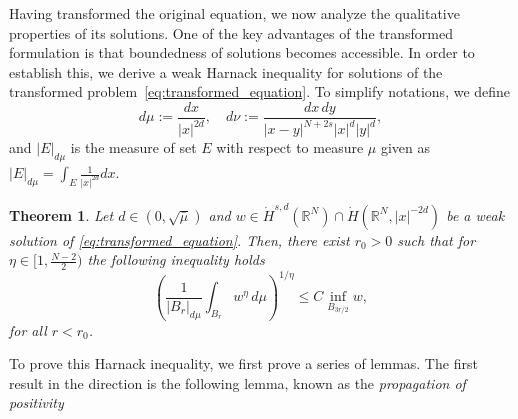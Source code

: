 \documentclass[11pt]{article}
\newtheorem{theorem}{Theorem}[section] %
\newcommand{\rnn}{\mathbb{R}^{N}}
\begin{document}
Having transformed the original equation, we now analyze the qualitative properties of its solutions. One of the key advantages of the transformed formulation is that boundedness of solutions becomes accessible. In order to establish this, we derive a weak Harnack inequality for solutions of the transformed problem~\eqref{eq:transformed_equation}. To simplify notations, we define
\begin{equation*}
    d\mu := \frac{dx}{|x|^{2d}}, \quad 
    d\nu := \frac{dx\,dy}{|x - y|^{N + 2s} |x|^{d} |y|^{d}},
\end{equation*}
and $|E|_{d\mu}$ is the measure of set $E$ with respect to measure $\mu$ given as $|E|_{d\mu} = \int_{E} \frac{1}{|x|^{2 d}} dx$.
\begin{theorem}\label{thm:harnack_inequality_transformed}
Let $d \in (0,\sqrt{\bar{\mu}})$ and $w \in \dot{H}^{s,d}(\mathbb{R}^N) \cap \dot{H}(\rnn,|x|^{-2d})$ be a weak solution of \eqref{eq:transformed_equation}. Then, there exist $r_0 > 0$ such that for $\eta \in [1,\frac{N-2}{2})$ the following inequality holds
\begin{equation*}
        \left( \frac{1}{|B_r|_{d\mu}}\int_{B_r} w^{\eta} \, d\mu \right)^{1/\eta} \leq C \inf_{B_{3r/2}} w,
\end{equation*}
for all $r < r_0$.
\end{theorem}
To prove this Harnack inequality, we first prove a series of lemmas. The first result in the direction is the following lemma, known as the \textit{propagation of positivity}
\end{document}
